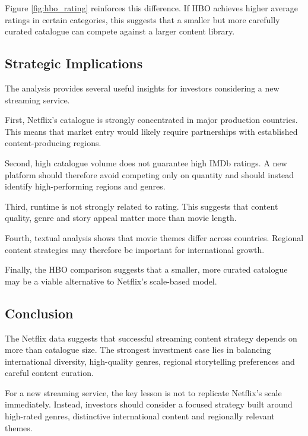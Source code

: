 \documentclass[11pt,preprint]{elsarticle}
\numberwithin{equation}{section}
\numberwithin{figure}{section}
\numberwithin{table}{section}
\begin{document}
Figure \ref{fig:hbo_rating} reinforces this difference. If HBO achieves
higher average ratings in certain categories, this suggests that a
smaller but more carefully curated catalogue can compete against a
larger content library.

\subsection{Strategic Implications}\label{strategic-implications}

The analysis provides several useful insights for investors considering
a new streaming service.

First, Netflix's catalogue is strongly concentrated in major production
countries. This means that market entry would likely require
partnerships with established content-producing regions.

Second, high catalogue volume does not guarantee high IMDb ratings. A
new platform should therefore avoid competing only on quantity and
should instead identify high-performing regions and genres.

Third, runtime is not strongly related to rating. This suggests that
content quality, genre and story appeal matter more than movie length.

Fourth, textual analysis shows that movie themes differ across
countries. Regional content strategies may therefore be important for
international growth.

Finally, the HBO comparison suggests that a smaller, more curated
catalogue may be a viable alternative to Netflix's scale-based model.

\subsection{Conclusion}\label{conclusion}

The Netflix data suggests that successful streaming content strategy
depends on more than catalogue size. The strongest investment case lies
in balancing international diversity, high-quality genres, regional
storytelling preferences and careful content curation.

For a new streaming service, the key lesson is not to replicate
Netflix's scale immediately. Instead, investors should consider a
focused strategy built around high-rated genres, distinctive
international content and regionally relevant themes.

\begin{verbatim}
\end{verbatim}

\newpage


\end{document}
